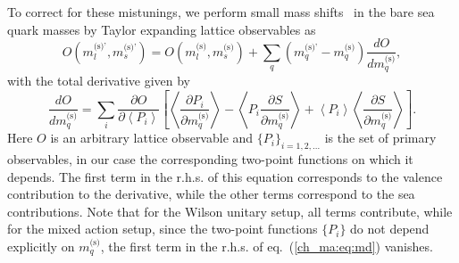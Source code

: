 To correct for these mistunings, we perform small mass shifts~\citep{Bruno:2016plf} in the bare sea quark masses by Taylor expanding lattice observables as
\begin{equation}
\label{ch_ma:eq:mass_shift}
{O}\left(m_l^{\textrm{(s)'}},m_s^{\textrm{(s)'}}\right)={O}\left(m_l^{\textrm{(s)}},m_s^{\textrm{(s)}}\right)+\sum_q\left(m_q^{\textrm{(s)'}}-m_q^{\textrm{(s)}}\right)\frac{d{O}}{dm_q^{\textrm{(s)}}},
\end{equation}
with the total derivative given by
\begin{equation}
\label{ch_ma:eq:md}
\frac{d{O}}{dm_q^{\textrm{(s)}}}=\sum_i\frac{\partial{O}}{\partial \left<P_i\right>}\left[\left<\frac{\partial P_i}{\partial m_q^{\textrm{(s)}}}\right>-\left<P_i\frac{\partial S}{\partial m_q^{\textrm{(s)}}}\right>+\left<P_i\right>\left<\frac{\partial S}{\partial m_q^{\textrm{(s)}}}\right>\right].
\end{equation}
Here ${O}$ is an arbitrary lattice observable and $\{P_i\}_{i=1,2,...}$ is the set of primary observables, in our case the corresponding two-point functions on which it depends. The first term in the r.h.s. of this equation corresponds to the valence contribution to the derivative, while the other terms correspond to the sea contributions. Note that for the Wilson unitary setup, all terms contribute, while for the mixed action setup, since the two-point functions $\{P_i\}$ do not depend explicitly on $m_q^{\textrm{(s)}}$, the first term in the r.h.s. of eq.~(\ref{ch_ma:eq:md}) vanishes.

